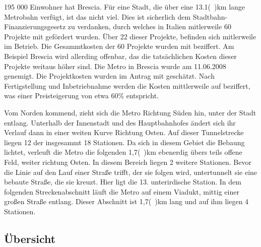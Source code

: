 195 000 Einwohner hat Brescia. Für eine Stadt, die über eine 13.1(\ )km lange Metrobahn verfügt, ist das nicht viel. Dies ist sicherlich dem Stadtbahn-Finanzierungsgesetz zu verdanken, durch welches in Italien mitlerweile 60 Projekte mit  gefördert wurden. Über 22 dieser Projekte, befinden sich mitlerweile im Betrieb. Die Gesammtkosten der 60 Projekte wurden mit  beziffert. Am Beispiel Brescia wird allerding offenbar, das die tatsächlichen Kosten dieser Projekte weitaus höher sind. Die Metro in Brescia wurde am 11.06.2008 genemigt. Die Projektkosten wurden im Antrag mit  geschätzt.\cite{brescSv} Nach Fertigstellung und Inbetriebnahme werden die Kosten mittlerweile auf  beziffert, was einer Preisteigerung von etwa 60\% entspricht\cite{brescRai}.  

Vom Norden kommend, zieht sich die Metro Richtung Süden hin, unter der Stadt entlang. Unterhalb der Innenstadt und des Hauptbahnhofes ändert sich ihr Verlauf dann in einer weiten Kurve Richtung Osten. Auf dieser Tunnelstrecke liegen 12 der insgesammt 18 Stationen. Da sich in diesem Gebiet die Bebaung lichtet, verleuft die Metro die folgenden 1,7(\ )km ebenerdig übers teils offene Feld, weiter richtung Osten. In diesem Bereich liegen 2 weitere Stationen. Bevor die Linie auf den Lauf einer Straße trifft, der sie folgen wird, untertunnelt sie eine bebaute Straße, die sie kreuzt. Hier ligt die 13. unterirdische Station. In dem folgenden Streckenabschnitt läuft die Metro auf einem Viadukt, mittig einer großen Straße entlang. Dieser Abschnitt ist 1,7(\ )km lang und auf ihm liegen 4 Stationen.\cite{brescSts}


\begin{landscape}
\section{Übersicht}

\end{landscape}

